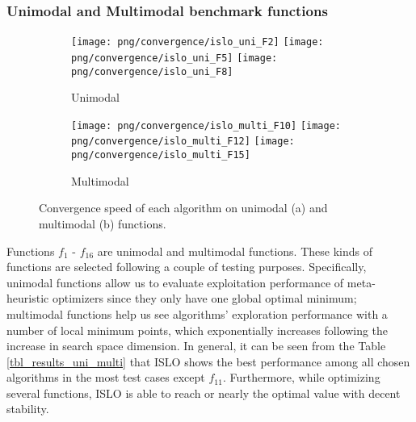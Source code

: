 \documentclass[../main.tex]{subfiles}
\begin{document}
\subsubsection{Unimodal and Multimodal benchmark functions}
\begin{figure}[!ht] 
   \centering
   \begin{subfigure}{0.49\textwidth}
   	\texttt{[image: png/convergence/islo\_uni\_F2]}
  	 \texttt{[image: png/convergence/islo\_uni\_F5]}
  	 \texttt{[image: png/convergence/islo\_uni\_F8]}
  	\caption{Unimodal}
  	\label{subfig:uni_convergence}
  	\end{subfigure}
   \begin{subfigure}{0.49\textwidth}
   	\texttt{[image: png/convergence/islo\_multi\_F10]}
  	 \texttt{[image: png/convergence/islo\_multi\_F12]}
  	 \texttt{[image: png/convergence/islo\_multi\_F15]}
  	 \caption{Multimodal}
  	\label{subfig:multi_convergence}
  	\end{subfigure}
  \caption{Convergence speed of each algorithm on unimodal (a) and multimodal (b) functions.} 
  \label{fig_uni_multi_convergence} 
\end{figure}
	Functions $f_1$ - $f_{16}$ are unimodal and multimodal functions. These kinds of functions are selected following a couple of testing purposes. Specifically, unimodal functions allow us to evaluate exploitation performance of meta-heuristic optimizers since they only have one global optimal minimum; multimodal functions help us see algorithms' exploration performance with a number of local minimum points, which exponentially increases following the increase in search space dimension. In general, it can be seen from the Table \ref{tbl_results_uni_multi} that ISLO shows the best performance among all chosen algorithms in the most test cases except $f_{11}$. Furthermore, while optimizing several functions, ISLO is able to reach or nearly the optimal value with decent stability.
	 
\end{document}
